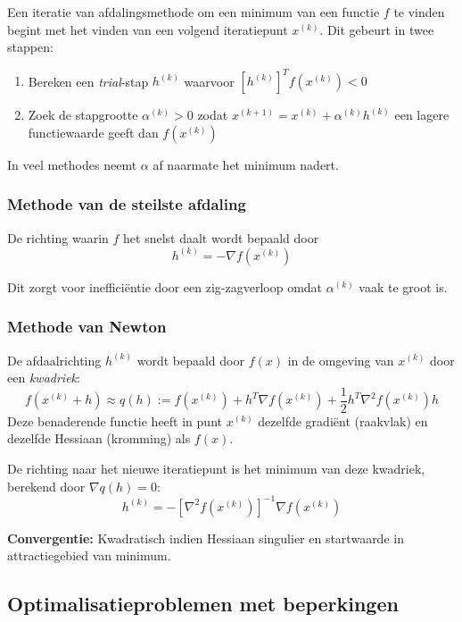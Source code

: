 \documentclass{article}
\begin{document}
	Een iteratie van afdalingsmethode om een minimum van een functie $f$ te vinden begint met het vinden van een volgend iteratiepunt $x^(k)$. Dit gebeurt in twee stappen:
	\begin{enumerate}
		\item Bereken een \textit{trial}-stap $h^{(k)}$ waarvoor $[h^{(k)}]^T f(x^{(k)}) < 0$
		\item Zoek de stapgrootte $\alpha^{(k)} > 0$ zodat $x^{(k+1)} = x^{(k)} + \alpha^{(k)} h^{(k)}$ een lagere functiewaarde geeft dan $f(x^{(k)})$
	\end{enumerate}


	In veel methodes neemt $\alpha$ af naarmate het minimum nadert.	
	
	\subsubsection{Methode van de steilste afdaling}
	
	De richting waarin $f$ het snelst daalt wordt bepaald door 
	$$
		h^{(k)} = -\nabla f(x^{(k)})
	$$
	
	Dit zorgt voor inefficiëntie door een zig-zagverloop omdat $\alpha^{(k)}$ vaak te groot is.	
	
	\subsubsection{Methode van Newton}
	
	De afdaalrichting $h^{(k)}$ wordt bepaald door $f(x)$ in de omgeving van $x^{(k)}$ door een \textit{kwadriek}:
	$$
		f(x^{(k)} + h) \approx q(h) := f(x^{(k)}) + h^T \nabla f(x^{(k)}) + \frac{1}{2} h^T \nabla^2 f(x^{(k)})h
	$$
	Deze benaderende functie heeft in punt $x^{(k)}$ dezelfde gradiënt (raakvlak) en dezelfde Hessiaan (kromming) als $f(x)$.
	
	De richting naar het nieuwe iteratiepunt is het minimum van deze kwadriek, berekend door $ \nabla q(h) = 0 $:
	$$
		h^{(k)} = -[\nabla^2f(x^{(k)})]^{-1} \nabla f(x^{(k)})
	$$
	
	\textbf{Convergentie:} Kwadratisch indien Hessiaan singulier en startwaarde in attractiegebied van minimum.
	
	
	\subsection{Optimalisatieproblemen met beperkingen}
	
\end{document}
